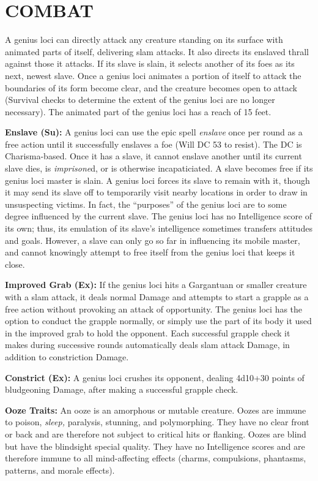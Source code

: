 \documentclass{article}
\begin{document}
{\section*{COMBAT }

A genius loci can directly attack any creature standing on its surface with animated 
parts of itself, delivering slam attacks. It also directs its enslaved thrall against 
those it attacks. If its slave is slain, it selects another of its foes as its 
next, newest slave. Once a genius loci animates a portion of itself to attack the 
boundaries of its form become clear, and the creature becomes open to attack (Survival 
checks to determine the extent of the genius loci are no longer necessary). The 
animated part of the genius loci has a reach of 15 feet. 

\textbf{Enslave (Su):} A genius loci can use the epic spell \textit{enslave }once 
per round as a free action until it successfully enslaves a foe (Will DC 53 to 
resist). The DC is Charisma-based. Once it has a slave, it cannot enslave another 
until its current slave dies, is \textit{imprisone}d, or is otherwise incapaticiated. 
A slave becomes free if its genius loci master is slain. A genius loci forces its 
slave to remain with it, though it may send its slave off to temporarily visit 
nearby locations in order to draw in unsuspecting victims. In fact, the ``purposes'' 
of the genius loci are to some degree influenced by the current slave. The genius 
loci has no Intelligence score of its own; thus, its emulation of its slave's intelligence 
sometimes transfers attitudes and goals. However, a slave can only go so far in 
influencing its mobile master, and cannot knowingly attempt to free itself from 
the genius loci that keeps it close. 

\textbf{Improved Grab (Ex):} If the genius loci hits a Gargantuan or smaller creature 
with a slam attack, it deals normal Damage and attempts to start a grapple as a 
free action without provoking an attack of opportunity. The genius loci has the 
option to conduct the grapple normally, or simply use the part of its body it used 
in the improved grab to hold the opponent. Each successful grapple check it makes 
during successive rounds automatically deals slam attack Damage, in addition to 
constriction Damage. 

\textbf{Constrict (Ex):} A genius loci crushes its opponent, dealing 4d10+30 points 
of bludgeoning Damage, after making a successful grapple check. 

\textbf{Ooze Traits:} An ooze is an amorphous or mutable creature. Oozes are immune 
to poison, \textit{sleep, }paralysis, stunning, and polymorphing. They have no 
clear front or back and are therefore not subject to critical hits or flanking. 
Oozes are blind but have the blindsight special quality. They have no Intelligence 
scores and are therefore immune to all mind-affecting effects (charms, compulsions, 
phantasms, patterns, and morale effects). 

}
\end{document}
